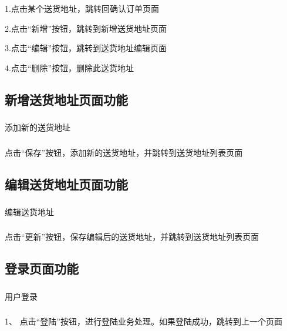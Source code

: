 \subsubsection*{}
1.点击某个送货地址，跳转回确认订单页面

2.点击“新增”按钮，跳转到新增送货地址页面

3.点击“编辑”按钮，跳转到送货地址编辑页面

4.点击“删除”按钮，删除此送货地址

\subsection{新增送货地址页面功能}
\subsubsection*{}
添加新的送货地址
\subsubsection*{}
点击“保存”按钮，添加新的送货地址，并跳转到送货地址列表页面

\subsection{编辑送货地址页面功能}
\subsubsection*{}
编辑送货地址
\subsubsection*{}
点击“更新”按钮，保存编辑后的送货地址，并跳转到送货地址列表页面

\subsection{登录页面功能}
\subsubsection*{}
用户登录
\subsubsection*{}
1、 点击“登陆”按钮，进行登陆业务处理。如果登陆成功，跳转到上一个页面


